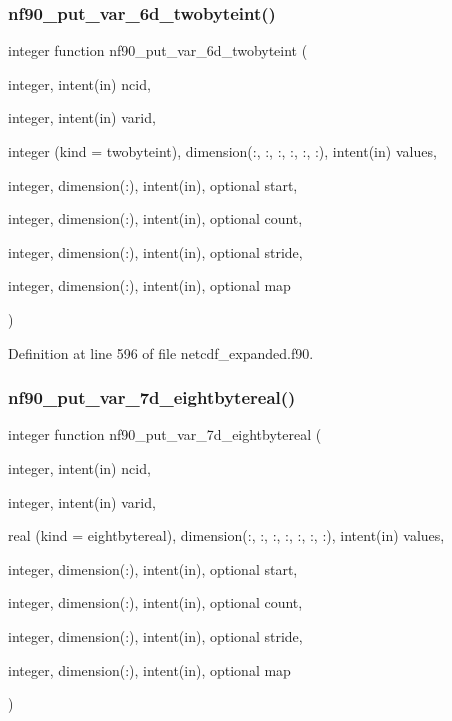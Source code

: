 \subsubsection{\texorpdfstring{nf90\+\_\+put\+\_\+var\+\_\+6d\+\_\+twobyteint()}{nf90\_put\_var\_6d\_twobyteint()}}
{\footnotesize\ttfamily integer function nf90\+\_\+put\+\_\+var\+\_\+6d\+\_\+twobyteint (\begin{DoxyParamCaption}\item[{integer, intent(in)}]{ncid,  }\item[{integer, intent(in)}]{varid,  }\item[{integer (kind = twobyteint), dimension(\+:, \+:, \+:, \+:, \+:, \+:), intent(in)}]{values,  }\item[{integer, dimension(\+:), intent(in), optional}]{start,  }\item[{integer, dimension(\+:), intent(in), optional}]{count,  }\item[{integer, dimension(\+:), intent(in), optional}]{stride,  }\item[{integer, dimension(\+:), intent(in), optional}]{map }\end{DoxyParamCaption})}



Definition at line 596 of file netcdf\+\_\+expanded.\+f90.

\mbox{\label{netcdf__expanded_8f90_a0432ac8d8e80a5083fcd4a389e05066e}} 
\subsubsection{\texorpdfstring{nf90\+\_\+put\+\_\+var\+\_\+7d\+\_\+eightbytereal()}{nf90\_put\_var\_7d\_eightbytereal()}}
{\footnotesize\ttfamily integer function nf90\+\_\+put\+\_\+var\+\_\+7d\+\_\+eightbytereal (\begin{DoxyParamCaption}\item[{integer, intent(in)}]{ncid,  }\item[{integer, intent(in)}]{varid,  }\item[{real (kind = eightbytereal), dimension(\+:, \+:, \+:, \+:, \+:, \+:, \+:), intent(in)}]{values,  }\item[{integer, dimension(\+:), intent(in), optional}]{start,  }\item[{integer, dimension(\+:), intent(in), optional}]{count,  }\item[{integer, dimension(\+:), intent(in), optional}]{stride,  }\item[{integer, dimension(\+:), intent(in), optional}]{map }\end{DoxyParamCaption})}



